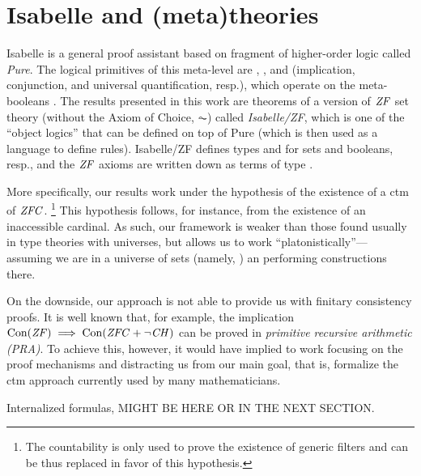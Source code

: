 \section{Isabelle and (meta)theories}
\label{sec:isabelle-metatheories}

Isabelle \cite{Isabelle,DBLP:books/sp/Paulson94} is a general proof
assistant based on fragment of higher-order logic called
\emph{Pure}. The logical primitives of this meta-level are
\isatt{\isasymLongrightarrow}, \isatt{\&\&\&}, and \isatt{\isasymAnd}
(implication, conjunction, and universal
quantification, resp.), which operate on the meta-booleans
. The results presented in this work are theorems of a
version of $\mathit{ZF}$ set theory (without the Axiom of Choice, $\AC$) 
called \emph{Isabelle/ZF}, which is one of the
``object logics'' that can be defined on top of Pure (which is then
used as a language to define rules). Isabelle/ZF defines types
 and  for sets and booleans, resp., and the $\mathit{ZF}$
axioms are written down as terms of type .

More specifically, our results work under the hypothesis of
the existence of a ctm of $\mathit{ZFC}$.%
\footnote{The countability is only used to prove the existence of
  generic filters and can be thus replaced in favor of this
  hypothesis.} 
This hypothesis follows, for instance, from the existence of an
inaccessible cardinal. As such, our framework is weaker than those
found usually in type theories with universes, but allows us to work
``platonistically''--- assuming we are in a universe of sets (namely,
) an performing constructions there. 

On the downside, our approach is not able to provide us with finitary
consistency proofs. It is well known that, for example, the
implication $\operatorname{Con}(\mathit{ZF}) \implies \operatorname{Con}(\mathit{ZFC}+\neg\mathit{CH})$ can be proved in
\emph{primitive recursive arithmetic (PRA)}. To achieve this, however,
it would have implied to work focusing on the proof mechanisms
and distracting us from our main goal, that is, formalize the ctm
approach currently used by many mathematicians.

\begin{framed}
  Internalized formulas, MIGHT BE HERE OR IN THE NEXT SECTION.
\end{framed}

